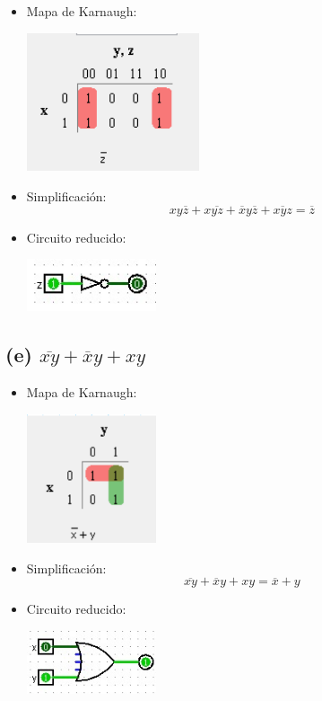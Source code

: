 \begin{itemize}
    \item Mapa de Karnaugh:
\begin{center}
    \includegraphics[width=0.4\textwidth]{recursos/Ejercicio3/mapas/mapa_d).png}
\end{center}

    \item Simplificación: \[ xy\overline{z} + x\overline{yz} + \overline{x}y\overline{z} + \overline{xyz} = \overline{z} \]

    \item Circuito reducido:
\begin{center}
    \includegraphics[width=0.3\textwidth]{recursos/Ejercicio3/circuito/circuito_d).png}
\end{center}
\end{itemize}

\subsection*{(e) $\overline{xy} + \overline{x}y + xy$}

\begin{itemize}
    \item Mapa de Karnaugh:
\begin{center}
    \includegraphics[width=0.3\textwidth]{recursos/Ejercicio3/mapas/mapa_e).png}
\end{center}

    \item Simplificación: \[ \overline{xy} + \overline{x}y + xy = \overline{x} + y \]

    \item Circuito reducido:
\begin{center}
    \includegraphics[width=0.3\textwidth]{recursos/Ejercicio3/circuito/circuito_e).png}
\end{center}
\end{itemize}

